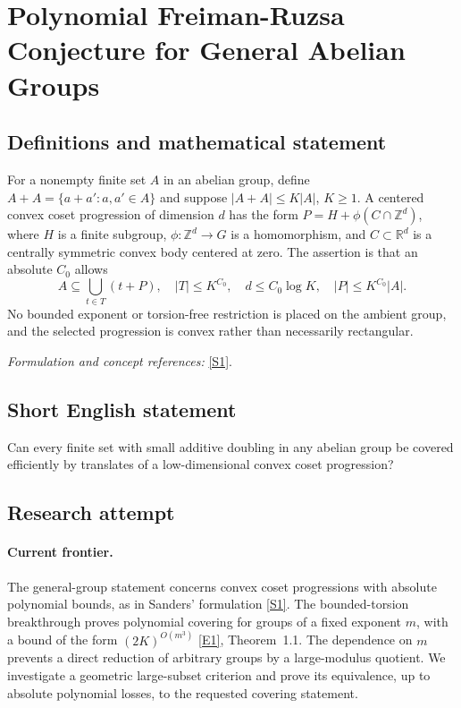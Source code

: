 \documentclass[11pt,a4paper]{article}
\newcommand{\Z}{\mathbb{Z}}
\newcommand{\R}{\mathbb{R}}
\newcommand{\sref}[2]{\hyperlink{source:#1:#2}{[S#2]}}
\newcommand{\eref}[2]{\hyperlink{extra:#1:#2}{[E#2]}}
\newif\ifshowcatalogue
\newcommand{\cataloguescope}[1]{\ifshowcatalogue
 \paragraph{Exact scope in the supplied catalogue.}
 \begin{quote}\small #1\end{quote}\fi}
\numberwithin{equation}{section}
\begin{document}
\setcounter{section}{194}
\clearpage
\section{\texorpdfstring{Polynomial Freiman-Ruzsa Conjecture for General Abelian Groups}{Polynomial Freiman-Ruzsa Conjecture for General Abelian Groups}}\label{195}
\subsection{Definitions and mathematical statement}
For a nonempty finite set $A$ in an abelian group, define $A+A=\{a+a':a,a'\in A\}$ and suppose $|A+A|\le K|A|$, $K\ge1$. A centered convex coset progression of dimension $d$ has the form
$P=H+\phi(C\cap\Z^d)$, where $H$ is a finite subgroup, $\phi:\Z^d\to G$ is a homomorphism, and $C\subset\R^d$ is a centrally symmetric convex body centered at zero. The assertion is that an absolute $C_0$ allows
\[
 A\subseteq\bigcup_{t\in T}(t+P),\quad |T|\le K^{C_0},
 \quad d\le C_0\log K,\quad |P|\le K^{C_0}|A|.
\]
No bounded exponent or torsion-free restriction is placed on the ambient group, and the selected progression is convex rather than necessarily rectangular.
\par\smallskip\textit{Formulation and concept references:} \sref{195}{1}.
\cataloguescope{Prove that there is an absolute constant C such that for every finite subset A of an arbitrary abelian group with |A+A| <= K|A|, the set A can be covered by exp(C log K) translates of a centred convex coset progression of dimension at most C log K and size at most exp(C log K)|A|.}
\subsection{Short English statement}
Can every finite set with small additive doubling in any abelian group be covered efficiently by translates of a low-dimensional convex coset progression?
\subsection{Research attempt}

\paragraph{Current frontier.}
The general-group statement concerns convex coset progressions with absolute polynomial bounds, as in Sanders' formulation \sref{195}{1}. The bounded-torsion breakthrough proves polynomial covering for groups of a fixed exponent $m$, with a bound of the form $(2K)^{O(m^3)}$ \eref{195}{1}, Theorem~1.1. The dependence on $m$ prevents a direct reduction of arbitrary groups by a large-modulus quotient. We investigate a geometric large-subset criterion and prove its equivalence, up to absolute polynomial losses, to the requested covering statement.
\end{document}
